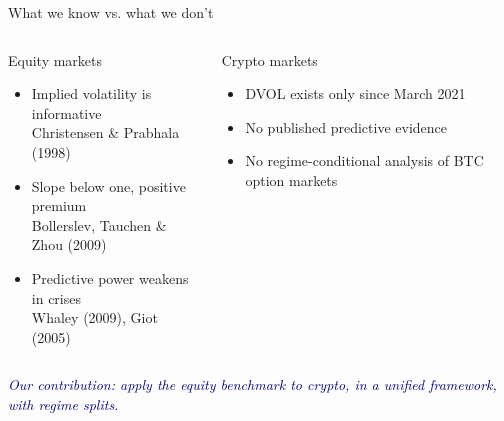 \documentclass[aspectratio=169,11pt]{beamer}
\begin{document}
\begin{frame}{What we know vs. what we don't}
  \vspace*{2mm}
  \begin{columns}[T,onlytextwidth]
    \begin{block}{Equity markets}
      \begin{itemize}
        \setlength\itemsep{2mm}
        \item Implied volatility is informative \\
          {\footnotesize Christensen \& Prabhala (1998)}
        \item Slope below one, positive premium \\
          {\footnotesize Bollerslev, Tauchen \& Zhou (2009)}
        \item Predictive power weakens in crises \\
          {\footnotesize Whaley (2009), Giot (2005)}
      \end{itemize}
    \end{block}
    \begin{block}{Crypto markets}
      \begin{itemize}
        \setlength\itemsep{2mm}
        \item DVOL exists only since March 2021
        \item No published predictive evidence
        \item No regime-conditional analysis of BTC option markets
      \end{itemize}
    \end{block}
  \end{columns}
  \vspace*{4mm}
  \begin{center}
    \textcolor{navy}{\itshape Our contribution: apply the equity benchmark to crypto, in a unified framework, with regime splits.}
  \end{center}
\end{frame}
\end{document}
